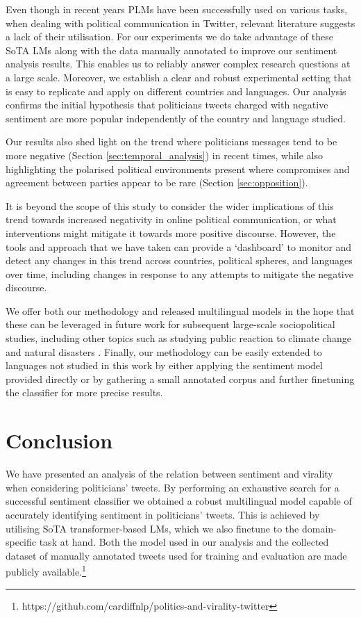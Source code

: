 Even though in recent years \acp{PLM} have been successfully used on various tasks, when dealing with political communication in Twitter, relevant literature suggests a lack of their utilisation. For our experiments we do take advantage of these \ac{SoTA} \acp{LM} along with the data manually annotated to improve our sentiment analysis results. This enables us to reliably answer complex research questions at a large scale.  Moreover, we establish a clear and robust experimental setting that is easy to replicate and apply on different countries and languages. Our analysis confirms the initial hypothesis that politicians tweets charged with negative sentiment are more popular  independently of the country and language studied.

Our results also shed light on the trend where politicians messages tend to be more negative (Section \ref{sec:temporal_analysis}) in recent times, while also highlighting the polarised political environments present where compromises and agreement between parties appear to be rare (Section \ref{sec:opposition}).

It is beyond the scope of this study to consider the wider implications of this trend towards increased negativity in online political communication, or what interventions might mitigate it towards more positive discourse. However, the tools and approach that we have taken can provide a `dashboard' to monitor and detect any changes in this trend across countries, political spheres, and languages over time, including changes in response to any attempts to mitigate the negative discourse.

We offer both our methodology and released multilingual models in the hope that these can be leveraged in future work for subsequent large-scale sociopolitical studies, including other topics such as studying public reaction to climate change and natural disasters \cite{ContrerasMojica2022}. Finally, our methodology can be easily extended to languages not studied in this work by either applying the sentiment model provided directly or by gathering a small annotated corpus and further finetuning the classifier for more precise results.

\section{Conclusion}
We have presented an analysis of the relation between sentiment and virality when considering politicians' tweets. By performing an exhaustive search for a successful sentiment classifier we obtained a robust multilingual model capable of accurately identifying sentiment in politicians' tweets. This is achieved by utilising \ac{SoTA} transformer-based \acp{LM}, which we also finetune to the domain-specific task at hand. Both the model used in our analysis and the collected dataset of manually annotated tweets used for training and evaluation are made publicly available.\footnote{https://github.com/cardiffnlp/politics-and-virality-twitter}


